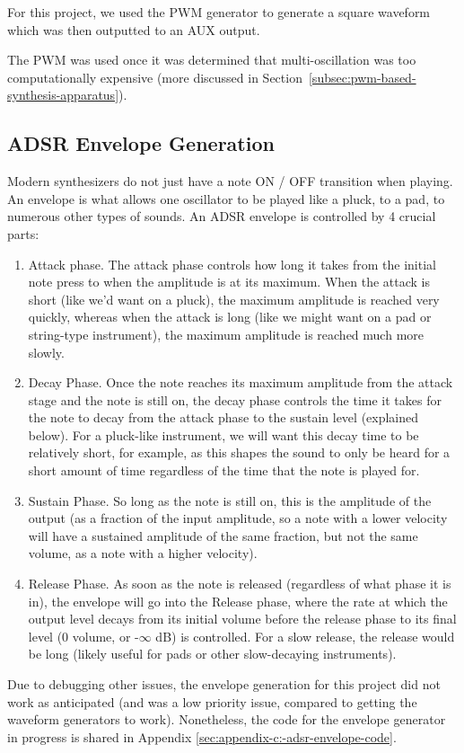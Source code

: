 For this project, we used the PWM generator to generate a square waveform which was then outputted to an AUX output.

The PWM was used once it was determined that multi-oscillation was too computationally expensive (more discussed in Section~\ref{subsec:pwm-based-synthesis-apparatus}).


\subsection{ADSR Envelope Generation}\label{subsec:envelope-generation-theory}

Modern synthesizers do not just have a note ON / OFF transition when playing. An envelope is what allows one oscillator to be played like a pluck, to a pad, to  numerous other types of sounds. An ADSR envelope is controlled by 4 crucial parts:


\begin{enumerate}
    \item Attack phase. The attack phase controls how long it takes from the initial note press to when the amplitude is at its maximum. When the attack is short (like we'd want on a pluck), the maximum amplitude is reached very quickly, whereas when the attack is long (like we might want on a pad or string-type instrument), the maximum amplitude is reached much more slowly. 
    \item Decay Phase. Once the note reaches its maximum amplitude from the attack stage and the note is still on, the decay phase controls the time it takes for the note to decay from the attack phase to the sustain level (explained below). For a pluck-like instrument, we will want this decay time to be relatively short, for example, as this shapes the sound to only be heard for a short amount of time regardless of the time that the note is played for. 
    \item Sustain Phase. So long as the note is still on, this is the amplitude of the output (as a fraction of the input amplitude, so a note with a lower velocity will have a sustained amplitude of the same fraction, but not the same volume, as a note with a higher velocity). 
    \item Release Phase. As soon as the note is released (regardless of what phase it is in), the envelope will go into the Release phase, where the rate at which the output level decays from its initial volume before the release phase to its final level (0 volume, or -$\infty$ dB) is controlled. For a slow release, the release would be long (likely useful for pads or other slow-decaying instruments). 
\end{enumerate}

Due to debugging other issues, the envelope generation for this project did not work as anticipated (and was a low priority issue, compared to getting the waveform generators to work). Nonetheless, the code for the envelope generator in progress is shared in Appendix \ref{sec:appendix-c:-adsr-envelope-code}. 